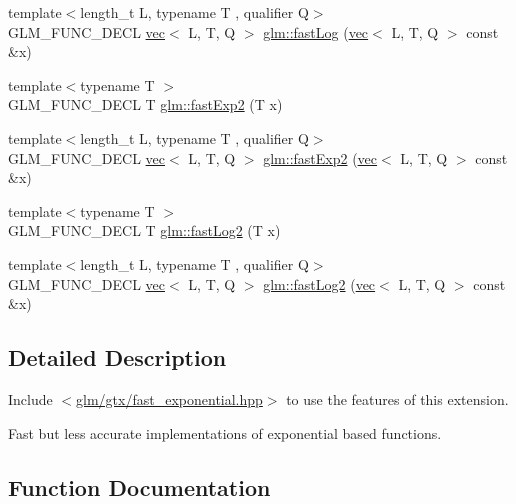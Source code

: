 \begin{DoxyCompactItemize}
\item 
{\footnotesize template$<$length\+\_\+t L, typename T , qualifier Q$>$ }\\G\+L\+M\+\_\+\+F\+U\+N\+C\+\_\+\+D\+E\+CL \hyperlink{structglm_1_1vec}{vec}$<$ L, T, Q $>$ \hyperlink{group__gtx__fast__exponential_ga937256993a7219e73f186bb348fe6be8}{glm\+::fast\+Log} (\hyperlink{structglm_1_1vec}{vec}$<$ L, T, Q $>$ const \&x)
\item 
{\footnotesize template$<$typename T $>$ }\\G\+L\+M\+\_\+\+F\+U\+N\+C\+\_\+\+D\+E\+CL T \hyperlink{group__gtx__fast__exponential_ga0af50585955eb14c60bb286297fabab2}{glm\+::fast\+Exp2} (T x)
\item 
{\footnotesize template$<$length\+\_\+t L, typename T , qualifier Q$>$ }\\G\+L\+M\+\_\+\+F\+U\+N\+C\+\_\+\+D\+E\+CL \hyperlink{structglm_1_1vec}{vec}$<$ L, T, Q $>$ \hyperlink{group__gtx__fast__exponential_gacaaed8b67d20d244b7de217e7816c1b6}{glm\+::fast\+Exp2} (\hyperlink{structglm_1_1vec}{vec}$<$ L, T, Q $>$ const \&x)
\item 
{\footnotesize template$<$typename T $>$ }\\G\+L\+M\+\_\+\+F\+U\+N\+C\+\_\+\+D\+E\+CL T \hyperlink{group__gtx__fast__exponential_ga6e98118685f6dc9e05fbb13dd5e5234e}{glm\+::fast\+Log2} (T x)
\item 
{\footnotesize template$<$length\+\_\+t L, typename T , qualifier Q$>$ }\\G\+L\+M\+\_\+\+F\+U\+N\+C\+\_\+\+D\+E\+CL \hyperlink{structglm_1_1vec}{vec}$<$ L, T, Q $>$ \hyperlink{group__gtx__fast__exponential_ga7562043539194ccc24649f8475bc5584}{glm\+::fast\+Log2} (\hyperlink{structglm_1_1vec}{vec}$<$ L, T, Q $>$ const \&x)
\end{DoxyCompactItemize}


\subsection{Detailed Description}
Include $<$\hyperlink{fast__exponential_8hpp}{glm/gtx/fast\+\_\+exponential.\+hpp}$>$ to use the features of this extension.

Fast but less accurate implementations of exponential based functions. 

\subsection{Function Documentation}
\mbox{\label{group__gtx__fast__exponential_gaa3180ac8f96ab37ab96e0cacaf608e10}} 
